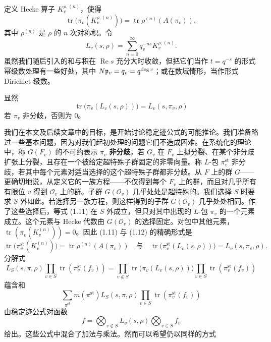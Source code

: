 定义 Hecke 算子 $K^{\rho,(n)}_v$，使得
\begin{equation}\tag{1.11}
\operatorname{tr}\bigl(\pi_v(K^{\rho,(n)}_v)\bigr)=\operatorname{tr}\rho^{(n)}(A(\pi_v)),
\end{equation}
其中 $\rho^{(n)}$ 是 $\rho$ 的 $n$ 次对称积。令
\[
L_v(s,\rho)=\sum_{n=0}^{\infty}q_v^{-ns}K^{\rho,(n)}_v.
\]
虽然我们随后引入的和与积在 $\operatorname{Re}s$ 充分大时收敛，但把它们当作 $t=q^{-s}$ 的形式幂级数处理有一些好处，其中 $N\mathfrak{p}_v=q_v=q^{\deg v}$；或在数域情形，当作形式 Dirichlet 级数。

显然
\begin{equation}\tag{1.12}
\operatorname{tr}\bigl(\pi_v(L_v(s,\rho))\bigr)=L_v(s,\pi_v,\rho)
\end{equation}
若 $\pi_v$ 非分歧，否则为 $0$。

我们在本文及后续文章中的目标，是开始讨论稳定迹公式的可能推论。我们准备略过一些基本问题，因为对我们起初处理的问题它们不造成困难。在系统化的理论中，称 $G(F_v)$ 的不可约表示 $\pi_v$ \textbf{非分歧}，若 $G_v$ 在 $F_v$ 上拟分裂、在某个非分歧扩张上分裂，且存在一个被给定超特殊子群固定的非零向量。称 $L$-包 $\pi^{\mathrm{st}}_v$ 非分歧，若其中每个元素对适当选择的这个超特殊子群都非分歧。从 $F$ 上的群 $G$——更确切地说，从定义它的一族方程——不仅得到每个 $F_v$ 上的群，而且对几乎所有有限位 $v$ 得到 $\mathcal{O}_v$ 上的群。子群 $G(\mathcal{O}_v)$ 几乎处处是超特殊的。我们选择 $S$ 时要求 $S$ 外如此。若选择另一族方程，则这样得到的子群 $G(\mathcal{O}_v)$ 几乎处处相同。作了这些选择后，等式 (1.11) 在 $S$ 外成立，但只对其中出现的 $L$-包 $\pi_v$ 的一个元素成立。这个元素与 Hecke 代数由 $G(\mathcal{O}_v)$ 的选择固定。对包中其他元素，$\operatorname{tr}(\pi_v(K^{(n)}_v))=0$。因此 (1.11) 与 (1.12) 的精确形式是
\[
\operatorname{tr}\bigl(\pi^{\mathrm{st}}_v(K^{(n)}_v)\bigr)=\operatorname{tr}\rho^{(n)}(A(\pi_v))
\quad\text{与}\quad
\operatorname{tr}\bigl(\pi^{\mathrm{st}}_v(L_v(s,\rho))\bigr)=L_v(s,\pi_v,\rho).
\]
分解式
\[
L_S(s,\pi,\rho)\prod_{v\in S}\operatorname{tr}(\pi^{\mathrm{st}}_v(f_v))
=\prod_{v\notin S}\operatorname{tr}\bigl(\pi_v(L_v(s,\rho))\bigr)
\prod_{v\in S}\operatorname{tr}(\pi^{\mathrm{st}}_v(f_v))
\]
蕴含和
\begin{equation}\tag{1.13}
\sum_{\pi^{\mathrm{st}}}m(\pi^{\mathrm{st}})L_S(s,\pi,\rho)\prod_{v\in S}\operatorname{tr}(\pi^{\mathrm{st}}_v(f_v))
\end{equation}
由稳定迹公式对函数
\begin{equation}\tag{1.14}
f=\bigotimes_{v\notin S}L_v(s,\rho)\bigotimes_{v\in S}f_v
\end{equation}
给出。这些公式中混合了加法与乘法。然而可以希望仍以同样的方式

